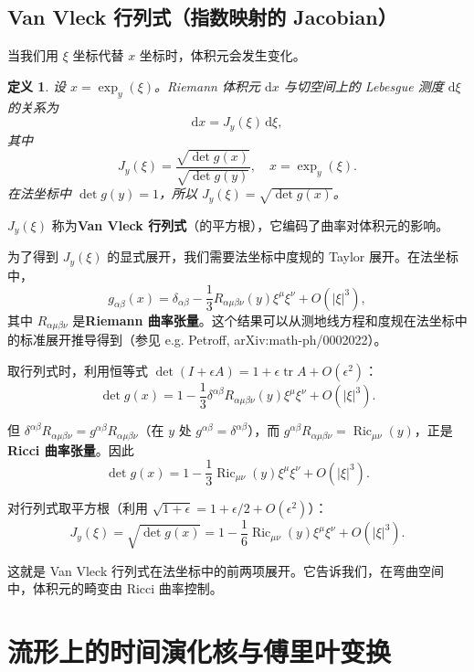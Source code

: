 \documentclass{book}
\newcommand{\mathd}{\mathrm{d}}
\newtheorem{definition}{定义}[chapter]
\begin{document}
\section{Van Vleck 行列式（指数映射的 Jacobian）}

当我们用 $\xi$ 坐标代替 $x$ 坐标时，体积元会发生变化。

\begin{definition}
  设 $x = \exp_y(\xi)$。Riemann 体积元 $\mathd x$ 与切空间上的 Lebesgue 测度 $\mathd \xi$ 的关系为
  \[
  \mathd x = J_y(\xi) \, \mathd \xi,
  \]
  其中
  \[
  J_y(\xi) = \frac{\sqrt{\det g(x)}}{\sqrt{\det g(y)}}, \quad x = \exp_y(\xi).
  \]
  在法坐标中 $\det g(y) = 1$，所以 $J_y(\xi) = \sqrt{\det g(x)}$。
\end{definition}

$J_y(\xi)$ 称为\textbf{Van Vleck 行列式}（的平方根），它编码了曲率对体积元的影响。

为了得到 $J_y(\xi)$ 的显式展开，我们需要法坐标中度规的 Taylor 展开。在法坐标中，
\[
g_{\alpha\beta}(x) = \delta_{\alpha\beta} - \frac{1}{3} R_{\alpha\mu\beta\nu}(y) \xi^\mu \xi^\nu + O(|\xi|^3),
\]
其中 $R_{\alpha\mu\beta\nu}$ 是\textbf{Riemann 曲率张量}。这个结果可以从测地线方程和度规在法坐标中的标准展开推导得到（参见 e.g. Petroff, arXiv:math-ph/0002022）。

取行列式时，利用恒等式 $\det(I + \epsilon A) = 1 + \epsilon \operatorname{tr} A + O(\epsilon^2)$：
\[
\det g(x) = 1 - \frac{1}{3} \delta^{\alpha\beta} R_{\alpha\mu\beta\nu}(y) \xi^\mu \xi^\nu + O(|\xi|^3).
\]

但 $\delta^{\alpha\beta} R_{\alpha\mu\beta\nu} = g^{\alpha\beta} R_{\alpha\mu\beta\nu}$（在 $y$ 处 $g^{\alpha\beta} = \delta^{\alpha\beta}$），而 $g^{\alpha\beta} R_{\alpha\mu\beta\nu} = \operatorname{Ric}_{\mu\nu}(y)$，正是\textbf{Ricci 曲率张量}。因此
\[
\det g(x) = 1 - \frac{1}{3} \operatorname{Ric}_{\mu\nu}(y) \xi^\mu \xi^\nu + O(|\xi|^3).
\]

对行列式取平方根（利用 $\sqrt{1 + \epsilon} = 1 + \epsilon/2 + O(\epsilon^2)$）：
\[
J_y(\xi) = \sqrt{\det g(x)} = 1 - \frac{1}{6} \operatorname{Ric}_{\mu\nu}(y) \xi^\mu \xi^\nu + O(|\xi|^3).
\]

这就是 Van Vleck 行列式在法坐标中的前两项展开。它告诉我们，在弯曲空间中，体积元的畸变由 Ricci 曲率控制。

\chapter{流形上的时间演化核与傅里叶变换}
\end{document}
